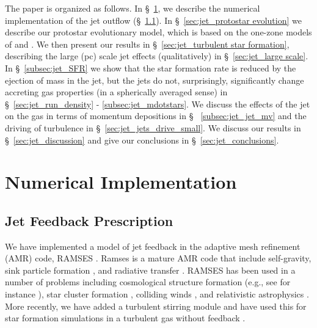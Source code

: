 \documentclass[../dissertation.tex]{subfiles}
\begin{document}
The paper is organized as follows.
In \S~\ref{sec:jet_implementation}, we describe the numerical implementation of the jet outflow (\S~\ref{sec:jet_jet feedback}).
In \S~\ref{sec:jet_protostar evolution} we describe our protostar evolutionary model, which is based on the one-zone models of \citet{2000ApJ...534..976N} and \citet{2009ApJ...703..131O}.
%
We then present our results in \S~\ref{sec:jet_turbulent star formation}, describing the large (pc) scale jet effects (qualitatively) in \S~\ref{sec:jet_large scale}.
In \S~\ref{subsec:jet_SFR} we show that the star formation rate is reduced by the ejection of mass in the jet, but the jets do not, surprisingly, significantly change accreting gas properties (in a spherically averaged sense) in \S ~\ref{sec:jet_run_density} - \ref{subsec:jet_mdotstars}.
We discuss the effects of the jet on the gas in terms of momentum depositions in  \S~ \ref{subsec:jet_jet_mv} and the driving of turbulence in \S~\ref{sec:jet_jets_drive_small}.
We discuss our results in \S~\ref{sec:jet_discussion} and give our conclusions in \S~\ref{sec:jet_conclusions}.

\section{Numerical Implementation}\label{sec:jet_implementation}

\subsection{Jet Feedback Prescription}\label{sec:jet_jet feedback}

We have implemented a model of jet feedback in the adaptive mesh refinement (AMR) code, RAMSES
 \citep{2002A&A...385..337T}.  Ramses is a mature AMR code that include self-gravity, sink particle formation \citep{2010MNRAS.409..985D,2014MNRAS.445.4015B}, and radiative transfer \citep{2013MNRAS.436.2188R,2015MNRAS.449.4380R}.  RAMSES has been used in a number of problems including cosmological structure formation (e.g., see for instance \citealt{2016MNRAS.463.1462O}), star cluster formation \citep{2017MNRAS.472.4155G}, %
colliding winds \citep{2011MNRAS.418.2618L,2017MNRAS.468.2655L}, and relativistic astrophysics \citep{2013A&A...560A..79L,2017arXiv170204362L}. More recently, we have added a turbulent stirring module and have used this for star formation simulations in a turbulent gas without feedback \citep{2017MNRAS.465.1316M}.
\end{document}
